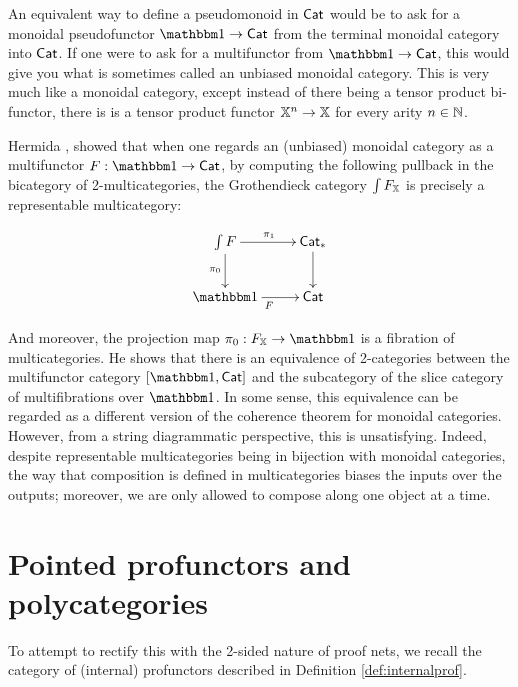 

An equivalent way to define a pseudomonoid in ${\sf Cat}$ would be to ask for a monoidal pseudofunctor $\one\to \Cat$ from the terminal monoidal category into ${\sf Cat}$.  If one were to ask for a multifunctor from $\one\to \Cat$, this would give you what is sometimes called an unbiased monoidal category. This is very much like a monoidal category, except instead of there being a tensor product bi-functor, there is is a tensor product functor $\mathbb{X}^n\to \mathbb{X}$ for every arity $n \in \mathbb{N}$.


Hermida \cite{hermida}, showed that when one regards an (unbiased) monoidal category as a multifunctor $F:\one\to\Cat$, by computing the following pullback in the bicategory of 2-multicategories, the Grothendieck category $\int F_{\mathbb{X}}$ is precisely a representable multicategory:

$$
\xymatrix{
\int  F \ar[r]^{\pi_1} \ar[d]_{\pi_0} & \Cat_* \ar[d] \\
\one \ar[r]_F & \Cat
}
$$



And moreover, the projection map $\pi_0:F_\X\to \one$ is a fibration of multicategories.  He shows that there is an equivalence of 2-categories between the multifunctor category $[\one,\Cat]$ and the subcategory of the slice category of multifibrations over $\one$.  
In some sense, this equivalence can be regarded as a different version of the coherence theorem for monoidal categories.
However, from a string diagrammatic perspective, this is unsatisfying.  Indeed, despite representable multicategories being in bijection with monoidal categories, the way that composition is defined in multicategories biases the inputs over the outputs; moreover, we are only allowed to compose along one object at a time.



\section{Pointed profunctors and polycategories}

To attempt to rectify this with the 2-sided nature of proof nets, we recall the category of (internal) profunctors described in Definition \ref{def:internalprof}.


